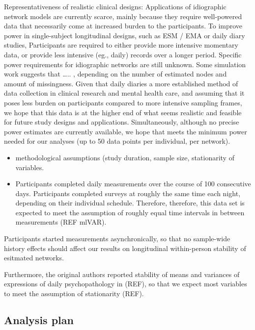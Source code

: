 \documentclass[
  english,
  man]{apa6}
\begin{document}
Representativeness of realistic clinical designs: Applications of idiographic network models are currently scarce, mainly because they require well-powered data that necessarily come at increased burden to the participants. To improve power in single-subject longitudinal designs, such as ESM / EMA or daily diary studies, Participants are required to either provide more intensive momentary data, or provide less intensive (eg., daily) records over a longer period. Specific power requirements for idiographic networks are still unknown. Some simulation work suggests that \ldots.. , depending on the number of estimated nodes and amount of missingness. Given that daily diaries a more established method of data collection in clinical research and mental health care, and assuming that it poses less burden on participants compared to more intensive sampling frames, we hope that this data is at the higher end of what seems realistic and feasible for future study designs and applications. Simultaneously, although no precise power estimates are currently available, we hope that meets the minimum power needed for our analyses (up to 50 data points per individual, per network).

\begin{itemize}
\item
  methodological assumptions (study duration, sample size, stationarity of variables.
\item
  Participants completed daily measurements over the course of 100 consecutive days. Participants completed surveys at roughly the same time each night, depending on their individual schedule. Therefore, therefore, this data set is expected to meet the assumption of roughly equal time intervals in between measurements (REF mlVAR).
\end{itemize}

Participants started measurements asynchronically, so that no sample-wide history effects should affect our results on longitudinal within-person stability of esitmated networks.

Furthermore, the original authors reported stability of means and variances of expressions of daily psychopathology in (REF), so that we expect most variables to meet the assumption of stationarity (REF).

\hypertarget{analysis-plan}{%
\subsection{Analysis plan}\label{analysis-plan}}
\end{document}
